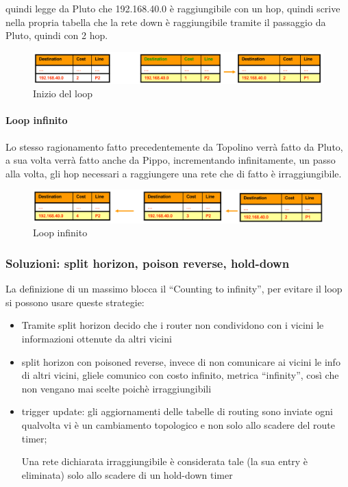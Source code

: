 quindi legge da Pluto che 192.168.40.0 è raggiungibile con un hop, quindi scrive nella propria tabella che la rete down è raggiungibile tramite il passaggio da Pluto, quindi con 2 hop.

\begin{figure}[h!]
    \centering
    \includegraphics[width=1\textwidth]{images/loop2.png}
    \caption{Inizio del loop}
    \label{fig:problemaloop2}
\end{figure}

\newpage
\paragraph{Loop infinito}
Lo stesso ragionamento fatto precedentemente da Topolino verrà fatto da Pluto, a sua volta verrà fatto anche da Pippo, incrementando infinitamente, un passo alla volta, gli hop necessari a raggiungere una rete che di fatto è irraggiungibile.
\begin{figure}[h!]
    \centering
    \includegraphics[width=1\textwidth]{images/loop3.png}
    \caption{Loop infinito}
    \label{fig:problemaloop3}
\end{figure}

\subsubsection{Soluzioni: split horizon, poison reverse, hold-down}
La definizione di un massimo blocca il “Counting to infinity”, per evitare il loop si possono usare queste strategie:
\begin{itemize}
    \item Tramite split horizon decido che i router non condividono con i vicini le informazioni ottenute da altri vicini
    \item split horizon con poisoned reverse, invece di non comunicare ai vicini le info di altri vicini, gliele comunico con costo infinito, metrica “infinity”, così che non vengano mai scelte poichè irraggiungibili
    \item trigger update: gli aggiornamenti delle tabelle di routing sono inviate ogni
qualvolta vi è un cambiamento topologico e non solo allo scadere del route
timer;

Una rete dichiarata irraggiungibile è considerata tale (la sua entry è
eliminata) solo allo scadere di un hold-down timer
\end{itemize}

